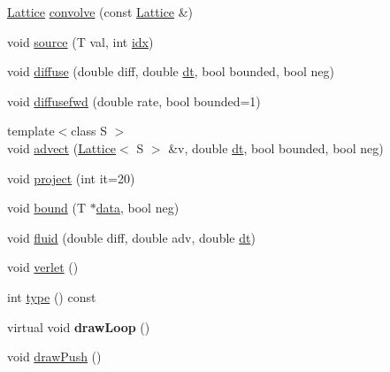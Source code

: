 \begin{DoxyCompactItemize}
\item 
\hyperlink{classvsr_1_1_lattice}{Lattice} \hyperlink{classvsr_1_1_lattice_a521845d9633d937734d673daae005d23}{convolve} (const \hyperlink{classvsr_1_1_lattice}{Lattice} \&)
\item 
void \hyperlink{classvsr_1_1_lattice_a1eb3b576efe08739583c0ac20d8f380c}{source} (T val, int \hyperlink{classvsr_1_1_lattice_adb69198162bacf492faea0ceff8e497c}{idx})
\item 
void \hyperlink{classvsr_1_1_lattice_a4a3f7d255b8f17bc6064292409872d17}{diffuse} (double diff, double \hyperlink{classvsr_1_1_frame_a4a81e06d0bdede9557e9ee4333c8f6a0}{dt}, bool bounded, bool neg)
\item 
void \hyperlink{classvsr_1_1_lattice_a9ad3a6df7ed2d9cf8f02916b5c988221}{diffusefwd} (double rate, bool bounded=1)
\item 
{\footnotesize template$<$class S $>$ }\\void \hyperlink{classvsr_1_1_lattice_a8a86e7c02c394be8a0336981b7454fa3}{advect} (\hyperlink{classvsr_1_1_lattice}{Lattice}$<$ S $>$ \&v, double \hyperlink{classvsr_1_1_frame_a4a81e06d0bdede9557e9ee4333c8f6a0}{dt}, bool bounded, bool neg)
\item 
void \hyperlink{classvsr_1_1_lattice_a0564334d264ee20749a2d838da4b52c6}{project} (int it=20)
\item 
void \hyperlink{classvsr_1_1_lattice_a6ed8d139d13692565d2f38a538015d8d}{bound} (T $\ast$\hyperlink{classvsr_1_1_lattice_ac59d9a773db6eaca5875c270325ed407}{data}, bool neg)
\item 
void \hyperlink{classvsr_1_1_lattice_aed19b9829be0cfef0f23852d4a3eae7a}{fluid} (double diff, double adv, double \hyperlink{classvsr_1_1_frame_a4a81e06d0bdede9557e9ee4333c8f6a0}{dt})
\item 
void \hyperlink{classvsr_1_1_lattice_acae7193cc3e6867f09acde8e9f77f6c7}{verlet} ()
\item 
int \hyperlink{classvsr_1_1_lattice_a64681e5cac4bc2567b449697c4fc6bf9}{type} () const 
\item 
\hypertarget{classvsr_1_1_lattice_a95218fb25a204cb685687048dbd1f385}{virtual void {\bfseries draw\-Loop} ()}\label{classvsr_1_1_lattice_a95218fb25a204cb685687048dbd1f385}

\item 
\hypertarget{classvsr_1_1_lattice_af0c78f36cb4df72b89e153874c06a3dd}{void \hyperlink{classvsr_1_1_lattice_af0c78f36cb4df72b89e153874c06a3dd}{draw\-Push} ()}\label{classvsr_1_1_lattice_af0c78f36cb4df72b89e153874c06a3dd}


\end{DoxyCompactItemize}
